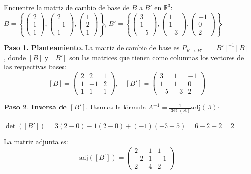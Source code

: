 \begin{prob} Encuentre la matriz de cambio de base de $B$ a $B'$ en $\mathbb{R}^3$: \\
$B=\left\{\begin{pmatrix}2\\1\\1\end{pmatrix}, \begin{pmatrix}2\\-1\\1\end{pmatrix}, \begin{pmatrix}1\\2\\1\end{pmatrix}\right\}$, 
$B'=\left\{\begin{pmatrix}3\\1\\-5\end{pmatrix}, \begin{pmatrix}1\\1\\-3\end{pmatrix}, \begin{pmatrix}-1\\0\\2\end{pmatrix}\right\}$

\begin{myproof}
\textbf{Paso 1. Planteamiento.} La matriz de cambio de base es $P_{B\to B'} = [B']^{-1}[B]$, donde $[B]$ y $[B']$ son las matrices que tienen como columnas los vectores de las respectivas bases:
$$[B] = \begin{pmatrix}2&2&1\\1&-1&2\\1&1&1\end{pmatrix}, \quad [B'] = \begin{pmatrix}3&1&-1\\1&1&0\\-5&-3&2\end{pmatrix}$$

\textbf{Paso 2. Inversa de $[B']$.} Usamos la fórmula $A^{-1} = \frac{1}{\det(A)}\text{adj}(A)$:

$\det([B']) = 3(2-0) - 1(2-0) + (-1)(-3+5) = 6 - 2 - 2 = 2$

La matriz adjunta es:
$$\text{adj}([B']) = \begin{pmatrix}2&1&1\\-2&1&-1\\2&4&2\end{pmatrix}$$


\end{myproof}
\end{prob}
